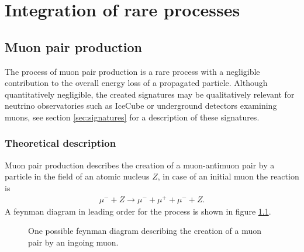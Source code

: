 \chapter{Integration of rare processes}

\section{Muon pair production}

The process of muon pair production is a rare process with a negligible contribution to the overall energy loss of a propagated particle.
Although quantitatively negligible, the created signatures may be qualitatively relevant for neutrino observatories such as IceCube or underground detectors examining muons, see section \ref{sec:signatures} for a description of these signatures.

\subsection{Theoretical description}

Muon pair production describes the creation of a muon-antimuon pair by a particle in the field of an atomic nucleus $Z$, in case of an initial muon the reaction is
\begin{align*}
    \mu^- + Z \rightarrow \mu^- + \mu^+ + \mu^- + Z.
\end{align*}
A feynman diagram in leading order for the process is shown in figure \ref{fig:feynman_mupair}.

\begin{figure}
	\centering
	
    \caption{One possible feynman diagram describing the creation of a muon pair by an ingoing muon.}
    \label{fig:feynman_mupair}
\end{figure}

